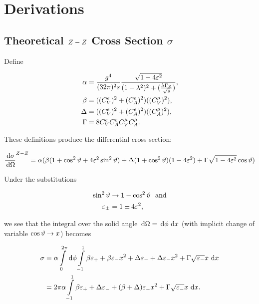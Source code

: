 \documentclass[]{report}
\begin{document}
\tableofcontents

\chapter{Derivations}

\section{Theoretical $Z -Z $ Cross Section $\sigma$}

Define

\begin{align*}
\alpha &= \frac{g^{4}}{(32\pi)^{2}s} \frac{\sqrt{1-4\varepsilon^{2}}}{(1-\lambda^{2})^{2} + (\frac{\lambda\Gamma_{\Zzero}}{\rts})},
\\
\beta &= ((C_{V}^{e})^{2} + (C_{A}^{e})^{2})((C_{V}^{\mu})^{2}),
\\
\Delta &= ((C_{V}^{e})^{2} + (C_{A}^{e})^{2})((C_{A}^{\mu})^{2}),
\\
\Gamma &= 8C_{V}^{e}C_{A}^{e}C_{V}^{\mu}C_{A}^{\mu}.
\end	{align*}

These definitions produce the differential cross section:

$$
\frac{\,\operatorname{d}\!{\sigma}}{\,\operatorname{d}\!{\Omega}}^{Z -Z }
  = \alpha(\beta(1+\cos^{2}{\vartheta}+4\varepsilon^{2}\sin^{2}{\vartheta})
    + \Delta(1+\cos^{2}{\vartheta})(1-4\varepsilon^{2})
    + \Gamma\sqrt{1-4\varepsilon^{2}}\cos{\vartheta}
  )
$$

Under the substitutions

\begin{align*}
\sin^{2}{\vartheta} &\rightarrow 1-\cos^{2}{\vartheta} \,\,\,\,\rm{and}\\
\varepsilon_{\pm} &= 1\pm4\varepsilon^{2},
\end{align*}

we see that the integral over the solid angle $\,\operatorname{d}\!{\Omega} = \,\operatorname{d}\!{\phi}\,\operatorname{d}\!{x}$ (with implicit change of variable $\cos{\vartheta}\rightarrow x$) becomes

\begin{align*}
\sigma &= \alpha\int\limits_{0}^{2\pi}\d{\phi}\int\limits_{-1}^{1}
  \beta\varepsilon_{+} + \beta\varepsilon_{-}x^{2} + \Delta\varepsilon_{-}
  + \Delta\varepsilon_{-}x^{2} + \Gamma\sqrt{\varepsilon_{-}}x
  \d{x}
  \\
  &= 2\pi\alpha\int\limits_{-1}^{1}
    \beta\varepsilon_{+} + \Delta\varepsilon_{-} + (\beta + \Delta)\varepsilon_{-}x^{2}
    + \Gamma\sqrt{\varepsilon_{-}}x
    \d{x}.
\end{align*}
\end{document}
